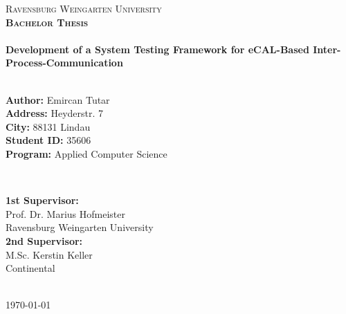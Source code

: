 \documentclass[a4paper,12pt,singlespacing]{article}
\begin{document}
\begin{titlepage}
	\textsc{\LARGE Ravensburg Weingarten University}\\[1cm] %
	\textsc{\large  \textbf{Bachelor Thesis}}\\[0.5cm] %
	
	
	\HRule \\[0.4cm]
	{ \huge \bfseries Development of a System Testing Framework for eCAL-Based Inter-Process-Communication}\\[0.4cm] %
	\HRule \\[1.5cm]
	
	
	\begin{minipage}{0.5\textwidth}
		\begin{flushleft}\fontsize{11pt}{14pt}\selectfont
		\textbf{Author:} Emircan Tutar\\[4pt]
		\textbf{Address:} Heyderstr. 7\\[4pt]
		\textbf{City:} 88131 Lindau\\[7pt]
		\textbf{Student ID:} 35606\\[4pt]
		\textbf{Program:} Applied Computer Science\\[4pt]
		\end{flushleft}
	\end{minipage}
	~
	\begin{minipage}{0.45\textwidth}
		\begin{flushleft} \fontsize{11pt}{14pt}\selectfont
		\textbf{1st Supervisor:} \\[2pt]
		Prof. Dr. Marius Hofmeister \\
		Ravensburg Weingarten University \\[10pt]
		\textbf{2nd Supervisor:} \\[2pt]
		M.Sc. Kerstin Keller \\
		Continental\\[7pt]
		\end{flushleft}
	\end{minipage}\\[3cm]
	
	
	{\large \today}\\[0cm] %
	
	\vfill %
	
\end{titlepage}
\end{document}
